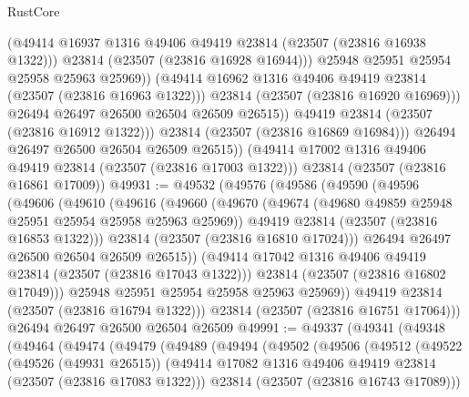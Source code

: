 \begin{lexlean}{RustCore}
\begin{coremodule}
                        (@49414 @16937 @1316 @49406 @49419 @23814 (@23507 (@23816 @16938 @1322)))
                        @23814
                        (@23507 (@23816 @16928 @16944)))
                      @25948
                      @25951
                      @25954
                      @25958
                      @25963
                      @25969))
                  (@49414 @16962 @1316 @49406 @49419 @23814 (@23507 (@23816 @16963 @1322)))
                  @23814
                  (@23507 (@23816 @16920 @16969)))
                @26494
                @26497
                @26500
                @26504
                @26509
                @26515))
            @49419
            @23814
            (@23507 (@23816 @16912 @1322)))
          @23814
          (@23507 (@23816 @16869 @16984)))
        @26494
        @26497
        @26500
        @26504
        @26509
        @26515))
    (@49414 @17002 @1316 @49406 @49419 @23814 (@23507 (@23816 @17003 @1322)))
    @23814
    (@23507 (@23816 @16861 @17009))
@49931 := @49532
    (@49576
      (@49586
        (@49590
          (@49596
            (@49606
              (@49610
                (@49616
                  (@49660
                    (@49670
                      (@49674 (@49680 @49859 @25948 @25951 @25954 @25958 @25963 @25969))
                      @49419
                      @23814
                      (@23507 (@23816 @16853 @1322)))
                    @23814
                    (@23507 (@23816 @16810 @17024)))
                  @26494
                  @26497
                  @26500
                  @26504
                  @26509
                  @26515))
              (@49414 @17042 @1316 @49406 @49419 @23814 (@23507 (@23816 @17043 @1322)))
              @23814
              (@23507 (@23816 @16802 @17049)))
            @25948
            @25951
            @25954
            @25958
            @25963
            @25969))
        @49419
        @23814
        (@23507 (@23816 @16794 @1322)))
      @23814
      (@23507 (@23816 @16751 @17064)))
    @26494
    @26497
    @26500
    @26504
    @26509
@49991 := @49337
    (@49341
      (@49348
        (@49464
          (@49474
            (@49479
              (@49489
                (@49494
                  (@49502
                    (@49506
                      (@49512
                        (@49522
                          (@49526 (@49931 @26515))
                          (@49414 @17082 @1316 @49406 @49419 @23814 (@23507 (@23816 @17083 @1322)))
                          @23814
                          (@23507 (@23816 @16743 @17089)))

\end{coremodule}
\end{lexlean}
